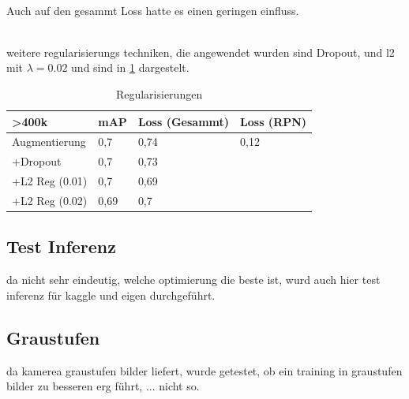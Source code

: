 \\[1cm]
Auch auf den gesammt Loss hatte es einen geringen
einfluss.
\\[1cm]
\begin{minipage}{0.5\textwidth}
  \centering
  \label{plot:map}
  \def\svgwidth{0.9\textwidth}
  
\end{minipage}
\begin{minipage}{0.5\textwidth}
  \centering
  \label{plot:loss}
  \def\svgwidth{0.9\textwidth}
  
\end{minipage}
\\[1cm]
weitere regularisierungs techniken, die angewendet wurden 
sind Dropout, und l2 mit $\lambda = 0.02$ und sind in 
\ref{table:reg} dargestelt.



\begin{table}[htb]
  \centering
  \label{table:reg}
  \begin{tabular}{m{}|m{}<{\centering}m{}<{\centering}m{}<{\centering}}
  \hline
  \textgreater 400k & mAP  & Loss (Gesammt) & Loss (RPN) \\ \hline\hline
  Augmentierung     & 0,7  & 0,74           &  0,12          \\
  +Dropout          & 0,7  & 0,73           &            \\
  +L2 Reg (0.01)    & 0,7  & 0,69           &            \\
  +L2 Reg (0.02)    & 0,69 & 0,7            &            \\ \hline
  \end{tabular}
  \caption{Regularisierungen}
\end{table}

\subsection{Test Inferenz}
da nicht sehr eindeutig, welche optimierung die 
beste ist, wurd auch hier test inferenz für 
kaggle und eigen durchgeführt.



\subsection{Graustufen}
da kamerea graustufen bilder liefert, wurde getestet, ob ein 
training in graustufen bilder zu besseren erg führt, ... nicht so.



